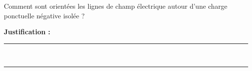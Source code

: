 Comment sont orientées les lignes de champ électrique autour d'une charge ponctuelle négative isolée ?

\choices

\noindent\textbf{Justification :} \hrulefill \\[2.5ex]
\rule{\linewidth}{0.4pt} \\[2.5ex]
\rule{\linewidth}{0.4pt}
\vfill
